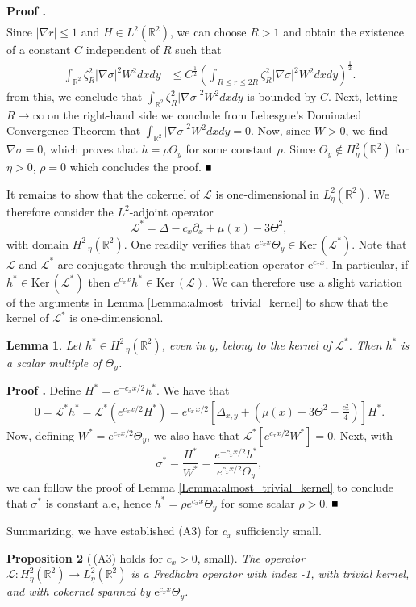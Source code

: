 \documentclass[10pt]{article}
\newtheorem{Lemma}{Lemma}[section]
\newtheorem{Proposition}[Lemma]{Proposition}
\newenvironment{Proof}[1][\unskip]%
 {\begin{trivlist} \item[]{\bf Proof #1. }}%
 {\hspace*{\fill}$\rule{.4\baselineskip}{.4\baselineskip}$\end{trivlist}}
\newcommand{\R}{\mathbb{R}}
\newcommand{\rme}{\mathrm{e}}
\renewcommand{\ker}{\mathrm{Ker}\,}
\renewcommand{\leq}{\leqslant}
\begin{document}
\begin{Proof}
\begin{align*}
\end{align*}
Since $|\nabla r| \leq 1$ and  $H\in L^2(\R^2)$, we can choose $R >1$ and obtain the existence of a constant $C$ independent of $R$ such that
%
\begin{align*}
\int_{\mathbb{R}^2} \zeta_R^2|\nabla \sigma|^2 W^2 dxdy &\leq C^{\frac{1}{2}}\left( \int_{R \leq r \leq 2R} \zeta_R^2|\nabla \sigma|^2 W^2 dxdy\right)^{\frac{1}{2}}.
\end{align*}
from this, we conclude  that  $\int_{\mathbb{R}^2} \zeta_R^2|\nabla \sigma|^2 W^2 dxdy$ is bounded by $C$. Next, letting $R \to \infty$ on the right-hand side we conclude from  Lebesgue's Dominated Convergence Theorem that $ \int_{\mathbb{R}^2} |\nabla \sigma|^2 W^2 dxdy =0.$ Now, since  $W >0$,  we find $\nabla \sigma =0$, which proves that $h=\rho \Theta_y$ for some constant $\rho$. Since $\Theta_y\not\in H^2_\eta(\R^2)$ for $\eta>0$, $\rho=0$ which concludes the proof. 
\end{Proof}
It remains to show that the cokernel of $\mathscr{L}$ is one-dimensional in $L^2_\eta(\R^2)$. We therefore consider the $L^2$-adjoint operator 
\[
\mathscr{L}^* = \Delta - c_x \partial_x  + \mu(x)  - 3\Theta^2,
\]
with domain $H^2_{-\eta}(\R^2)$.  One readily verifies that  $e^{c_x x} \Theta_y \in \ker(\mathscr{L}^*).$ Note that $\mathscr{L}$ and $\mathscr{L}^*$ are conjugate through the multiplication operator $\rme^{c_x x}$. In particular, if $h^* \in \ker\left(\mathscr{L}^*\right)$ then $e^{c_x x}h^* \in \ker\left(\mathscr{L}\right).$  We can therefore use a slight variation of the arguments in Lemma \ref{Lemma:almost_trivial_kernel} to show that the kernel of $\mathscr{L}^*$ is one-dimensional. 
%
\begin{Lemma}\label{lemma_L_star_kernel}
Let $h^* \in H^2_{-\eta}(\R^2)$, even in $y$,  belong to the kernel of $\mathscr{L}^*$.  Then $h^*$ is a scalar multiple of $\Theta_y$.
\end{Lemma}
\begin{Proof}
Define $H^* = e^{-c_x x/2}h^*$. We have that 
%
\begin{align*} 
0 = \mathscr{L}^* h^*  = \mathscr{L}^*(e^{c_x x/2}H^*) = e^{c_x\,x/2}\left[\Delta_{x,y} + \left(\mu(x) - 3\Theta^2 - \frac{c_x^2}{4}\right)\right]H^*.
\end{align*}
%
Now, defining $W^* = e^{c_x x/2}\Theta_y$, we also have that   $\mathscr{L}^*[e^{c_x x/2}W^*]=0$. Next, with 
\[
\sigma^* = \frac{H^*}{W^*} = \frac{e^{-c_xx/2}h^*}{e^{c_x x/2}\Theta_y},
\]
we can follow the proof of  Lemma \ref{Lemma:almost_trivial_kernel} to conclude that $\sigma^*$ is constant a.e, hence 
%
$h^*=\rho e^{c_x x}\Theta_y$ for some scalar $\rho>0$. 
\end{Proof}
Summarizing, we have established (A3) for $c_x$ sufficiently small. 
\begin{Proposition}[\,(A3) holds for $c_x>0$, small]\label{Theorem:index_linearized_operador}
The operator $\mathscr{L}: H^2_\eta(\R^2) \to L^2_\eta(\R^2)$ is a Fredholm operator with index -1, with trivial kernel, and with cokernel spanned by $\rme^{c_x x} \Theta_y$. 
\end{Proposition}
\end{document}
